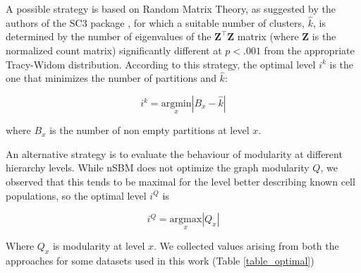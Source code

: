\documentclass[10pt]{article}
\begin{document}
A possible strategy is based on Random Matrix Theory, as suggested by the authors of the SC3 package  \cite{kiselev_2017}, for which a suitable number of clusters, $\hat{k}$, is determined by the number of eigenvalues of the $\boldsymbol Z^\top\boldsymbol Z$ matrix (where $\boldsymbol Z$ is the normalized count matrix) significantly different at $p<.001$ from the appropriate Tracy-Widom distribution. According to this strategy, the optimal level $i^k$ is the one that minimizes the number of partitions and $\hat{k}$:

\begin{equation}
i^k = \underset{x}{\mathrm{argmin}} |B_x - \hat{k}|
\label{Equation_RMT}
\end{equation}

where $B_x$ is the number of non empty partitions at level $x$.

An alternative strategy is to evaluate the behaviour of modularity at different hierarchy levels. While nSBM does not optimize the graph modularity $Q$, we observed that this tends to be maximal for the level better describing known cell populations, so the optimal level $i^Q$ is

\begin{equation}
i^Q = \underset{x}{\mathrm{argmax}} |Q_x|
\label{Equation_MODmax}
\end{equation}

Where $Q_x$ is modularity at level $x$. We collected values arising from both the approaches for some datasets used in this work (Table \ref{table_optimal})
\end{document}
